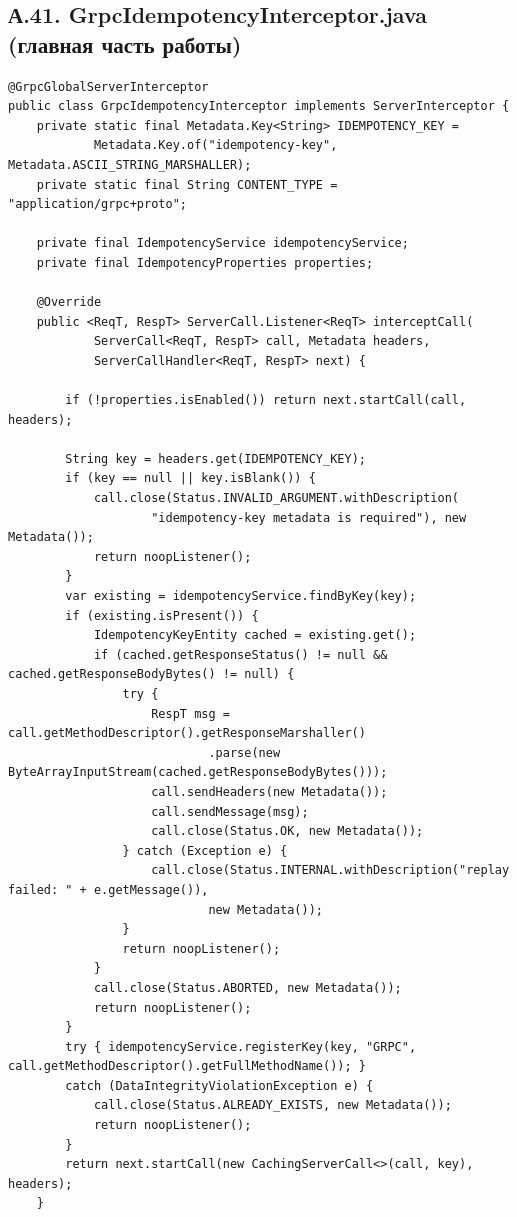 \subsection*{А.41. GrpcIdempotencyInterceptor.java (главная часть работы)}
\begin{lstlisting}[caption={Transport-generic перехватчик: переиспользует IdempotencyService}]
@GrpcGlobalServerInterceptor
public class GrpcIdempotencyInterceptor implements ServerInterceptor {
    private static final Metadata.Key<String> IDEMPOTENCY_KEY =
            Metadata.Key.of("idempotency-key", Metadata.ASCII_STRING_MARSHALLER);
    private static final String CONTENT_TYPE = "application/grpc+proto";

    private final IdempotencyService idempotencyService;
    private final IdempotencyProperties properties;

    @Override
    public <ReqT, RespT> ServerCall.Listener<ReqT> interceptCall(
            ServerCall<ReqT, RespT> call, Metadata headers,
            ServerCallHandler<ReqT, RespT> next) {

        if (!properties.isEnabled()) return next.startCall(call, headers);

        String key = headers.get(IDEMPOTENCY_KEY);
        if (key == null || key.isBlank()) {
            call.close(Status.INVALID_ARGUMENT.withDescription(
                    "idempotency-key metadata is required"), new Metadata());
            return noopListener();
        }
        var existing = idempotencyService.findByKey(key);
        if (existing.isPresent()) {
            IdempotencyKeyEntity cached = existing.get();
            if (cached.getResponseStatus() != null && cached.getResponseBodyBytes() != null) {
                try {
                    RespT msg = call.getMethodDescriptor().getResponseMarshaller()
                            .parse(new ByteArrayInputStream(cached.getResponseBodyBytes()));
                    call.sendHeaders(new Metadata());
                    call.sendMessage(msg);
                    call.close(Status.OK, new Metadata());
                } catch (Exception e) {
                    call.close(Status.INTERNAL.withDescription("replay failed: " + e.getMessage()),
                            new Metadata());
                }
                return noopListener();
            }
            call.close(Status.ABORTED, new Metadata());
            return noopListener();
        }
        try { idempotencyService.registerKey(key, "GRPC", call.getMethodDescriptor().getFullMethodName()); }
        catch (DataIntegrityViolationException e) {
            call.close(Status.ALREADY_EXISTS, new Metadata());
            return noopListener();
        }
        return next.startCall(new CachingServerCall<>(call, key), headers);
    }


\end{lstlisting}
